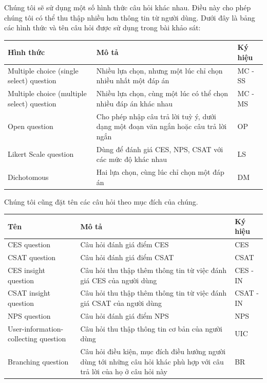 Chúng tôi sẽ sử dụng một số hình thức câu hỏi khác nhau. Điều này cho phép chúng tôi có thể thu thập nhiều hơn thông tin từ người dùng. Dưới đây là bảng các hình thức và tên câu hỏi được sử dụng trong bài khảo sát:
\begin{center}
    \begin{tabular}{|p{4cm} |p{8cm} |p{2cm}|}
        \hline
            Hình thức  & Mô tả & Ký hiệu \\ [0.5ex]
        \hline
            Multiple choice (single select) question & 
            Nhiều lựa chọn, nhưng một lúc chỉ chọn nhiều nhất một đáp án &
            MC - SS \\ 
        \hline
            Multiple choice (multiple select) question & 
            Nhiều lựa chọn, cùng một lúc có thể chọn nhiều đáp án khác nhau & 
            MC - MS \\
        \hline
            Open question & 
            Cho phép nhập câu trả lời tuỳ ý, dưới dạng một đoạn văn ngắn hoặc câu trả lời ngắn & 
            OP \\
        \hline
            Likert Scale question & 
            Dùng để đánh giá CES, NPS, CSAT với các mức độ khác nhau & 
            LS \\
        \hline
            Dichotomous & 
            Hai lựa chọn, cùng lúc chỉ chọn một đáp án & 
            DM \\ [1ex] 
        \hline
    \end{tabular}
\end{center}
\par
Chúng tôi cũng đặt tên các câu hỏi theo mục đích của chúng.
\begin{center}
   \begin{tabular}{|p{4cm} |p{8cm} |p{2cm}|}
        \hline
            Tên  & Mô tả & Ký hiệu \\ [0.5ex] 
        \hline
            CES question & 
            Câu hỏi đánh giá điểm CES & 
            CES \\
        \hline
            CSAT question & 
            Câu hỏi đánh giá điểm CSAT & 
            CSAT \\
        \hline
            CES insight question & 
            Câu hỏi thu thập thêm thông tin từ việc đánh giá CES của người dùng & 
            CES - IN \\
        \hline
            CSAT insight question & 
            Câu hỏi thu thập thêm thông tin từ việc đánh giá CSAT của người dùng & 
            CSAT - IN \\
        \hline
            NPS question & 
            Câu hỏi đánh giá điểm NPS & 
            NPS \\ 
        \hline
            User-information-collecting question & 
            Câu hỏi thu thập thông tin cơ bản của người dùng & 
            UIC \\
        \hline
            Branching question & 
            Câu hỏi điều kiện, mục đích điều hướng người dùng tới những câu hỏi khác phù hợp với câu trả lời của họ ở câu hỏi này & 
            BR \\ [1ex]
        \hline 
    \end{tabular}
\end{center}

